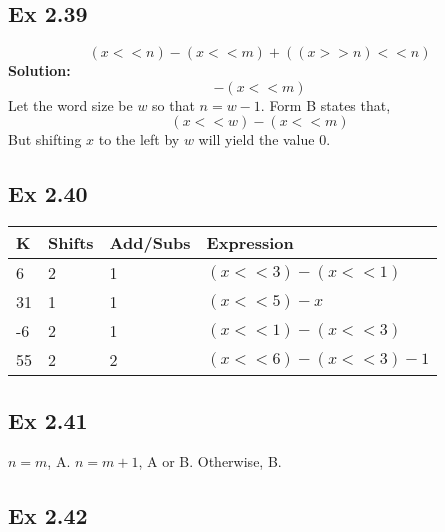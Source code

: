 \subsection{Ex 2.39}
$$
(x << n) - (x << m) + ((x >> n) << n)
$$
{\color{red}\textbf{Solution: }
$$-(x<<m)$$
Let the word size be $w$ so that $n = w - 1$. Form B states that,
$$(x<<w) - (x<<m)$$ But shifting $x$ to the left by $w$ will yield the value 0.
}
\subsection{Ex 2.40}
\begin{table}[h]
    \centering
    \begin{tabular}{llll}
        \toprule
        K & Shifts & Add/Subs & Expression\\
        \midrule
        6 & 2 & 1 & $(x << 3) - (x << 1)$\\
        31 & 1 & 1 & $(x << 5) - x$\\
        -6 & 2 & 1 & $(x << 1) - (x << 3)$\\
        55 & 2 & 2 & $(x << 6) - (x << 3) - 1$\\
        \bottomrule
    \end{tabular}
\end{table}

\subsection{Ex 2.41}
$n = m$, A. $n = m + 1$, A or B. Otherwise, B.

\subsection{Ex 2.42}






















